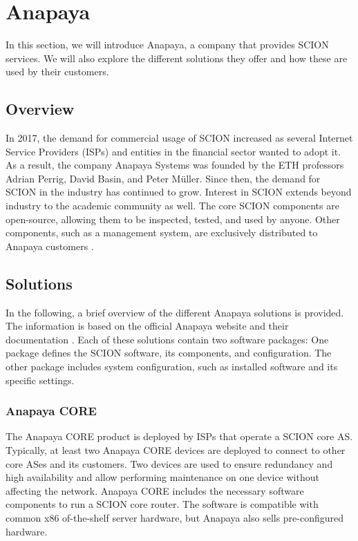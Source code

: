 \section{Anapaya}
\label{sec:anapaya}
In this section, we will introduce Anapaya, a company that provides SCION services.
We will also explore the different solutions they offer and how these are used by their customers.

\subsection{Overview}
In 2017, the demand for commercial usage of SCION increased as several Internet Service Providers (ISPs) and entities in the financial sector wanted to adopt it.
As a result, the company Anapaya Systems was founded by the ETH professors Adrian Perrig, David Basin, and Peter Müller.
Since then, the demand for SCION in the industry has continued to grow.
Interest in SCION extends beyond industry to the academic community as well.
The core SCION components are open-source, allowing them to be inspected, tested, and used by anyone.
Other components, such as a management system, are exclusively distributed to Anapaya customers \cite{ethzSecureInternet}.


\subsection{Solutions}
In the following, a brief overview of the different Anapaya solutions is provided.
The information is based on the official Anapaya website \cite{anapayaHomepage} and their documentation \cite{anapayaDocs}.
Each of these solutions contain two software packages:
One package defines the SCION software, its components, and configuration.
The other package includes system configuration, such as installed software and its  specific settings.

\subsubsection{Anapaya CORE}
The Anapaya CORE product is deployed by ISPs that operate a SCION core AS.
Typically, at least two Anapaya CORE devices are deployed to connect to other core ASes and its customers.
Two devices are used to ensure redundancy and high availability and allow performing maintenance on one device without affecting the network.
Anapaya CORE includes the necessary software components to run a SCION core router.
The software is compatible with common x86 of-the-shelf server hardware, but Anapaya also sells pre-configured hardware.


